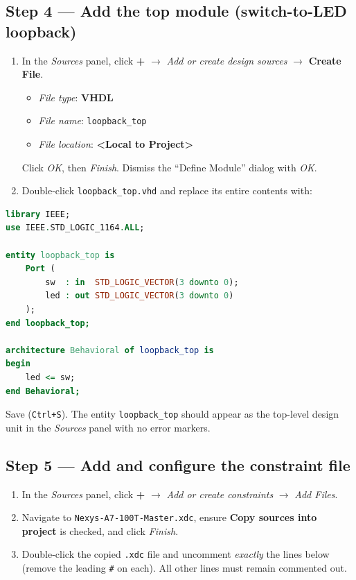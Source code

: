 \documentclass[11pt,letterpaper]{article}
\begin{document}

\newpage
\subsection{Step 4 --- Add the \VHDL{} top module (switch-to-LED loopback)}
\begin{enumerate}[leftmargin=2em]
	\item In the \textit{Sources} panel, click \textbf{+} $\to$ \textit{Add or create design sources} $\to$ \textbf{Create File}.
	\begin{itemize}[leftmargin=2em]
		\item \textit{File type}: \textbf{VHDL}
		\item \textit{File name}: \texttt{loopback\_top}
		\item \textit{File location}: \textbf{\textless Local to Project\textgreater}
	\end{itemize}
	Click \textit{OK}, then \textit{Finish}. Dismiss the ``Define Module'' dialog with \textit{OK}.
	\item Double-click \texttt{loopback\_top.vhd} and replace its entire contents with:
\end{enumerate}

\begin{lstlisting}[language=VHDL, caption={\texttt{loopback\_top.vhd} --- switch-to-LED direct assignment.}]
library IEEE;
use IEEE.STD_LOGIC_1164.ALL;

entity loopback_top is
    Port (
        sw  : in  STD_LOGIC_VECTOR(3 downto 0);
        led : out STD_LOGIC_VECTOR(3 downto 0)
    );
end loopback_top;

architecture Behavioral of loopback_top is
begin
    led <= sw;
end Behavioral;
\end{lstlisting}

Save (\texttt{Ctrl+S}). The entity \texttt{loopback\_top} should appear as the top-level design unit in the \textit{Sources} panel with no error markers.

\newpage
\subsection{Step 5 --- Add and configure the constraint file}
\begin{enumerate}[leftmargin=2em]
	\item In the \textit{Sources} panel, click \textbf{+} $\to$ \textit{Add or create constraints} $\to$ \textit{Add Files}.
	\item Navigate to \texttt{Nexys-A7-100T-Master.xdc}, ensure \textbf{Copy sources into project} is checked, and click \textit{Finish}.
	\item Double-click the copied \texttt{.xdc} file and uncomment \emph{exactly} the lines below (remove the leading \texttt{\#} on each). All other lines must remain commented out.
\end{enumerate}
\end{document}
